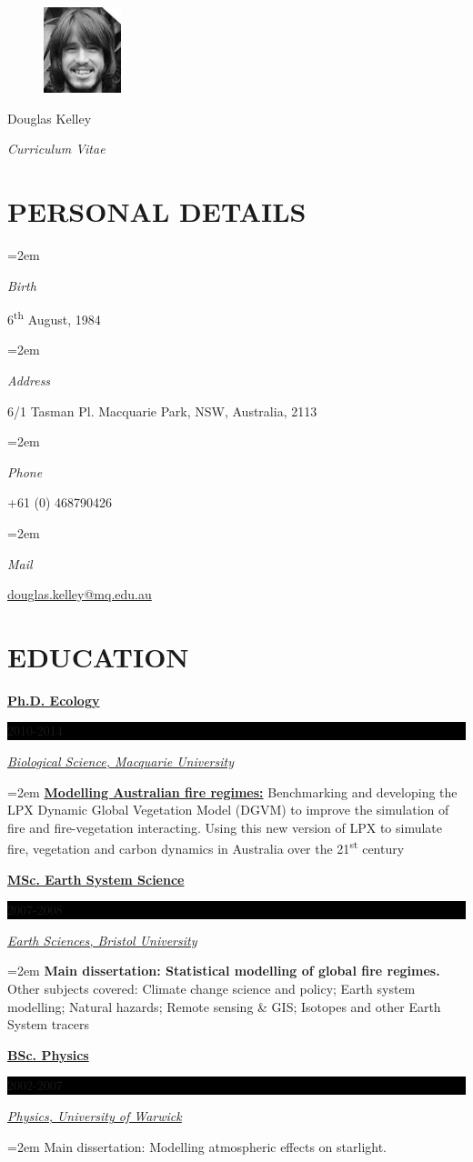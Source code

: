 \documentclass[paper=a4,fontsize=11pt]{scrartcl}	 			%
\newlength{\spacebox}
\newcommand{\sepspace}{\vspace*{1em}}			%
\newcommand{\MyName}[1]{
		\Huge \usefont{OT1}{phv}{b}{n} \hfill #1 		%
		\par \normalsize \normalfont}
\newcommand{\MySlogan}[1]{
		\large \usefont{OT1}{phv}{m}{n}\hfill \textit{#1} %
		\par \normalsize \normalfont}
\newcommand{\NewPart}[1]{\section*{\uppercase{#1}}}
\newcommand{\PersonalEntry}[2]{
		\noindent\hangindent=2em\hangafter=0 		%
		\parbox{\spacebox}{						%
		\textit{#1}}								%
		\hspace{1.5em} #2 \par}					%
\newcommand{\EducationEntry}[4]{
		\noindent \textbf{#1} \hfill 					%
		\colorbox{Black}{%
			\parbox{6.5em}{%
			\hfill\color{White}#2}} \par				%
		\noindent \textit{#3} \par					%
		\noindent\hangindent=2em\hangafter=0 \small #4 	%
		\normalsize \par}
\begin{document}
\begin{figure}
	\vspace*{-4em}
		\includegraphics[width=0.2\textwidth]{Doug-Kelley.jpg}
\end{figure}

\MyName{Douglas Kelley}
\MySlogan{Curriculum Vitae}

\sepspace

\NewPart{Personal details}{}

\PersonalEntry{Birth}{6\textsuperscript{th} August, 1984} 
\PersonalEntry{Address}{6/1 Tasman Pl. Macquarie Park, NSW, Australia, 2113}
\PersonalEntry{Phone}{+61 (0) 468790426}
\PersonalEntry{Mail}{\url{douglas.kelley@mq.edu.au}}

\NewPart{Education}{} 

\EducationEntry{\href{http://bcd.mq.edu.au/?page_id=171}{Ph.D. Ecology}}{2010-2014}{\href{http://bio.mq.edu.au/}{Biological Science, Macquarie University}}
  {\textbf{\href{http://bcd.mq.edu.au/?p=361}{Modelling Australian fire regimes:}} Benchmarking and developing the LPX Dynamic Global Vegetation Model (DGVM) to improve the simulation of fire and fire-vegetation interacting. Using this new version of LPX to simulate fire, vegetation and carbon dynamics in Australia over the 21\textsuperscript{st} century}
\sepspace

\EducationEntry{\href{http://www.bristol.ac.uk/cabot/postgrad/msc-ccsp.html}
             {MSc. Earth System Science}}{2007-2008}{\href{http://www.bristol.ac.uk/earthsciences/}{Earth Sciences, Bristol University}}
  {\textbf{Main dissertation: Statistical modelling of global fire regimes.} Other subjects covered: Climate change science and policy; Earth system modelling; Natural hazards; Remote sensing \& GIS; Isotopes and other Earth System tracers}
\sepspace

\EducationEntry{\href{http://www2.warwick.ac.uk/study/undergraduate/courses/f300}{BSc. Physics}}{2002-2007}{\href{http://www2.warwick.ac.uk/fac/sci/physics/}{Physics, University of Warwick}}
  {Main dissertation: Modelling atmospheric effects on starlight.}
  
\end{document}
